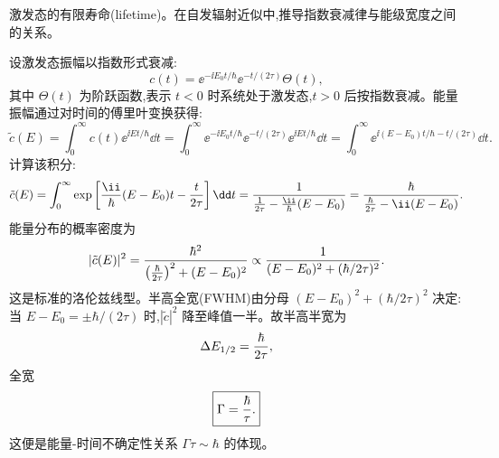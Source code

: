 \begin{question}
激发态的有限寿命(lifetime)。在自发辐射近似中,推导指数衰减律与能级宽度之间的关系。
\begin{solution}
设激发态振幅以指数形式衰减:
\[
c(t)=\ee^{-\ii E_0t/\hbar}\ee^{-t/(2\tau)}\Theta(t),
\]
其中 $\Theta(t)$ 为阶跃函数,表示 $t<0$ 时系统处于激发态,$t>0$ 后按指数衰减。能量振幅通过对时间的傅里叶变换获得:
\[
\tilde c(E)=\int_0^\infty c(t)\ee^{\ii Et/\hbar}\dd t
=\int_0^\infty \ee^{-\ii E_0t/\hbar}\ee^{-t/(2\tau)}\ee^{\ii Et/\hbar}\dd t
=\int_0^\infty \ee^{\ii(E-E_0)t/\hbar-t/(2\tau)}\dd t.
\]
计算该积分:
\[
\tilde c(E)=\int_0^\infty
\exp\left[{\ii\over\hbar}(E-E_0)t-{t\over2\tau}\right]\dd t
={1\over{1\over2\tau}-{\ii\over\hbar}(E-E_0)}
={\hbar\over{\hbar\over2\tau}-\ii(E-E_0)}.
\]
能量分布的概率密度为
\[
|\tilde c(E)|^2={\hbar^2\over\left({\hbar\over2\tau}\right)^2+(E-E_0)^2}
\propto{1\over(E-E_0)^2+(\hbar/2\tau)^2}.
\]
这是标准的洛伦兹线型。半高全宽(FWHM)由分母 $(E-E_0)^2+(\hbar/2\tau)^2$ 决定:当 $E-E_0=\pm\hbar/(2\tau)$ 时,$|\tilde c|^2$ 降至峰值一半。故半高半宽为
\[
\Delta E_{1/2}={\hbar\over2\tau},
\]
全宽
\[
\boxed{\Gamma={\hbar\over\tau}.}
\]
这便是能量-时间不确定性关系 $\Gamma\tau\sim\hbar$ 的体现。
\end{solution}
\end{question}

